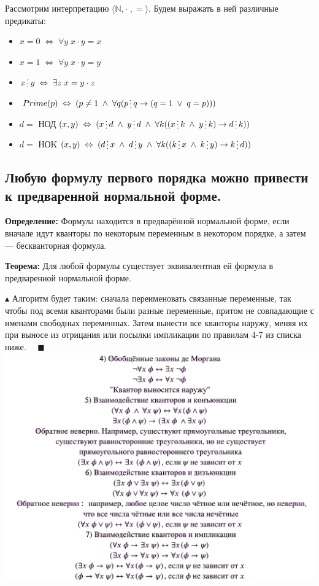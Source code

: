 Рассмотрим интерпретацию $\langle\mathbb{N},\cdot\;,=\rangle$. Будем выражать в ней различные предикаты:
\begin{itemize}
    \item $x = 0 \; \Leftrightarrow \; \forall y \; x \cdot y = x$
    \item $x = 1 \; \Leftrightarrow \; \forall y \; x \cdot y = y$
    \item $x \svdots y \; \Leftrightarrow \; \exists z \; x= y \cdot z$
    \item $Prime(p) \; \Leftrightarrow \; (p\neq 1 \;\land\; \forall q(p\svdots q \to (q=1 \;\lor\; q=p)))$
    \item $d=$ НОД$(x,y) \; \Leftrightarrow \; (x\svdots d \;\land\; y \svdots d \;\land\; \forall k ((x\svdots k \;\land\; y \svdots k)\to d \svdots k))$
    \item $d=$ НОK$(x,y) \; \Leftrightarrow \; (d\svdots x \;\land\; d \svdots y \;\land\; \forall k ((k\svdots x \;\land\; k \svdots y)\to k \svdots d))$
    
\end{itemize}

\subsection{Любую формулу первого порядка можно привести к предваренной нормальной форме.}

\textbf{Определение:} Формула находится в предварённой нормальной форме, если вначале идут кванторы по некоторым переменным в некотором порядке, а затем — бескванторная формула.

\textbf{Теорема:} Для любой формулы существует эквивалентная ей формула в предваренной нормальной форме.

$\blacktriangle$ Алгоритм будет таким: сначала переименовать связанные переменные, так чтобы под всеми кванторами были разные переменные, притом не совпадающие с именами свободных переменных. Затем вынести все кванторы наружу, меняя их при выносе из отрицания или посылки импликации по правилам 4-7 из списка ниже. $\quad \blacksquare$
\newline
\newline
\includegraphics[width=0.9\linewidth]{images/1_propositions_rules}

